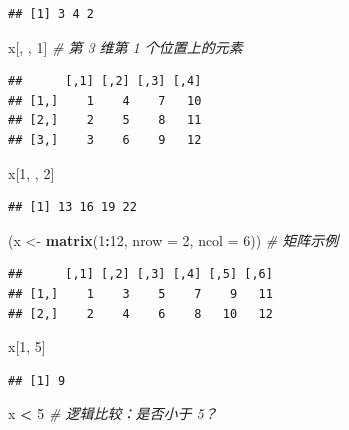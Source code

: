 \documentclass[
  b5paper,
  UTF8,twoside]{book}
\newenvironment{Shaded}{\begin{snugshade}}{\end{snugshade}}
\newcommand{\AttributeTok}[1]{\textcolor[rgb]{0.13,0.29,0.53}{#1}}
\newcommand{\CommentTok}[1]{\textcolor[rgb]{0.56,0.35,0.01}{\textit{#1}}}
\newcommand{\DecValTok}[1]{\textcolor[rgb]{0.00,0.00,0.81}{#1}}
\newcommand{\FunctionTok}[1]{\textcolor[rgb]{0.13,0.29,0.53}{\textbf{#1}}}
\newcommand{\NormalTok}[1]{#1}
\newcommand{\OtherTok}[1]{\textcolor[rgb]{0.56,0.35,0.01}{#1}}
\newcommand{\SpecialCharTok}[1]{\textcolor[rgb]{0.81,0.36,0.00}{\textbf{#1}}}
\begin{document}
\begin{verbatim}
## [1] 3 4 2
\end{verbatim}

\begin{Shaded}
\begin{Highlighting}[]
\NormalTok{x[, , }\DecValTok{1}\NormalTok{] }\CommentTok{\# 第 3 维第 1 个位置上的元素}
\end{Highlighting}
\end{Shaded}

\begin{verbatim}
##      [,1] [,2] [,3] [,4]
## [1,]    1    4    7   10
## [2,]    2    5    8   11
## [3,]    3    6    9   12
\end{verbatim}

\begin{Shaded}
\begin{Highlighting}[]
\NormalTok{x[}\DecValTok{1}\NormalTok{, , }\DecValTok{2}\NormalTok{]}
\end{Highlighting}
\end{Shaded}

\begin{verbatim}
## [1] 13 16 19 22
\end{verbatim}

\begin{Shaded}
\begin{Highlighting}[]
\NormalTok{(x }\OtherTok{\textless{}{-}} \FunctionTok{matrix}\NormalTok{(}\DecValTok{1}\SpecialCharTok{:}\DecValTok{12}\NormalTok{, }\AttributeTok{nrow =} \DecValTok{2}\NormalTok{, }\AttributeTok{ncol =} \DecValTok{6}\NormalTok{)) }\CommentTok{\# 矩阵示例}
\end{Highlighting}
\end{Shaded}

\begin{verbatim}
##      [,1] [,2] [,3] [,4] [,5] [,6]
## [1,]    1    3    5    7    9   11
## [2,]    2    4    6    8   10   12
\end{verbatim}

\begin{Shaded}
\begin{Highlighting}[]
\NormalTok{x[}\DecValTok{1}\NormalTok{, }\DecValTok{5}\NormalTok{]}
\end{Highlighting}
\end{Shaded}

\begin{verbatim}
## [1] 9
\end{verbatim}

\begin{Shaded}
\begin{Highlighting}[]
\NormalTok{x }\SpecialCharTok{\textless{}} \DecValTok{5} \CommentTok{\# 逻辑比较：是否小于 5？}
\end{Highlighting}
\end{Shaded}
\end{document}
